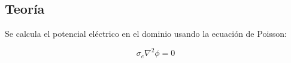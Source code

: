 \documentclass[a0,portrait]{a0poster}
\begin{document}
\begin{multicols}{2}
%
%

\color{DarkSlateGray} %

\section*{Teoría}

%
%


	Se calcula el potencial eléctrico en el dominio usando la ecuación de Poisson:

			\begin{equation}
				\sigma_{e} \nabla^2 \phi = 0
			\end{equation}\\



\end{multicols}
\end{document}
